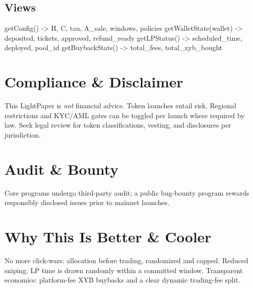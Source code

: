 \documentclass[10pt,twocolumn]{article}
\begin{document}
\subsection*{Views}
\begin{code}
getConfig() -> H, C, tau, A_sale, windows, policies
getWalletState(wallet) -> deposited, tickets, approved, refund_ready
getLPStatus() -> scheduled_time, deployed, pool_id
getBuybackStats() -> total_fees, total_xyb_bought
\end{code}

\section*{Compliance \& Disclaimer}
This LightPaper is \emph{not} financial advice. Token launches entail risk. Regional restrictions and KYC/AML gates can be toggled per launch where required by law. Seek legal review for token classifications, vesting, and disclosures per jurisdiction.

\section*{Audit \& Bounty}
Core programs undergo third-party audit; a public bug-bounty program rewards responsibly disclosed issues prior to mainnet launches.

\section*{Why This Is Better \& Cooler}
No more click-wars: allocation before trading, randomized and capped. Reduced sniping: LP time is drawn randomly within a committed window. Transparent economics: platform-fee \textdollar XYB buybacks and a clear dynamic trading-fee split.
\balance
\end{document}
